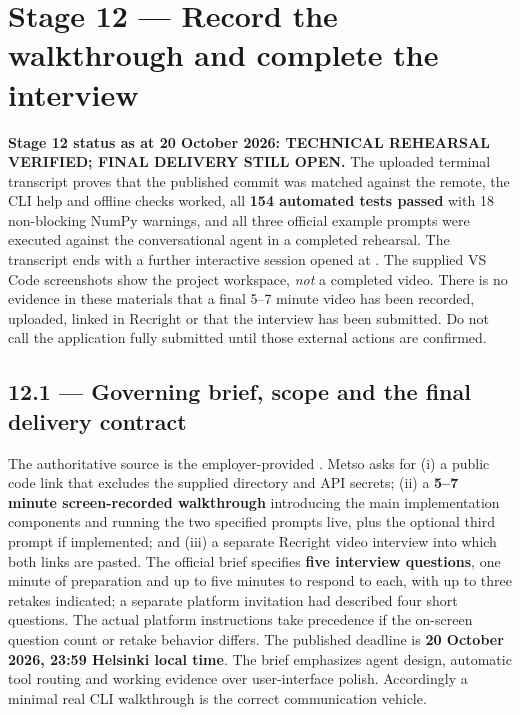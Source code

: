 \documentclass[11pt,a4paper]{article}
\DeclareRobustCommand{\code}[1]{{\ttfamily\small\detokenize{#1}}}
\begin{document}
\section{Stage 12 --- Record the walkthrough and complete the interview}
\begin{keybox}
\textbf{Stage 12 status as at 20 October 2026: TECHNICAL REHEARSAL VERIFIED; FINAL DELIVERY STILL OPEN.} The uploaded terminal transcript proves that the published commit was matched against the remote, the CLI help and offline checks worked, all \textbf{154 automated tests passed} with 18 non-blocking NumPy warnings, and all three official example prompts were executed against the conversational agent in a completed rehearsal. The transcript ends with a further interactive session opened at \code{You >}. The supplied VS Code screenshots show the project workspace, \emph{not} a completed video. There is no evidence in these materials that a final 5--7 minute video has been recorded, uploaded, linked in Recright or that the interview has been submitted. Do not call the application fully submitted until those external actions are confirmed.
\end{keybox}

\subsection{12.1 --- Governing brief, scope and the final delivery contract}
The authoritative source is the employer-provided \code{candidate-brief.md}. Metso asks for (i) a public code link that excludes the supplied \code{data/} directory and API secrets; (ii) a \textbf{5--7 minute screen-recorded walkthrough} introducing the main implementation components and running the two specified prompts live, plus the optional third prompt if implemented; and (iii) a separate Recright video interview into which both links are pasted. The official brief specifies \textbf{five interview questions}, one minute of preparation and up to five minutes to respond to each, with up to three retakes indicated; a separate platform invitation had described four short questions. The actual platform instructions take precedence if the on-screen question count or retake behavior differs. The published deadline is \textbf{20 October 2026, 23:59 Helsinki local time}. The brief emphasizes agent design, automatic tool routing and working evidence over user-interface polish. Accordingly a minimal real CLI walkthrough is the correct communication vehicle.
\end{document}

